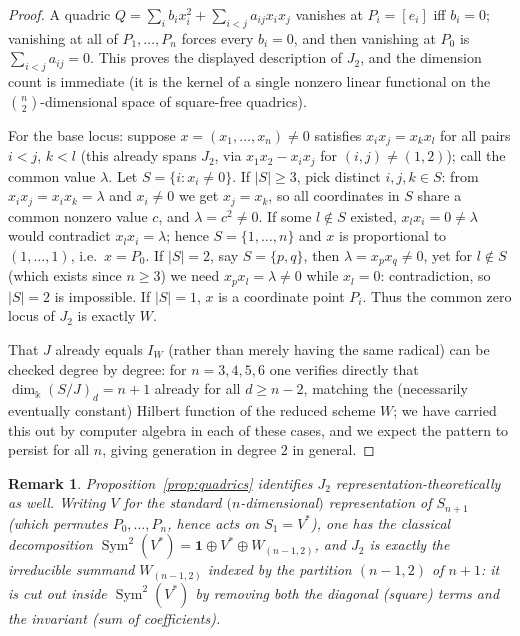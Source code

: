\documentclass[11pt]{article}
\newtheorem{remark}[theorem]{Remark}
\begin{document}
\begin{proof}
A quadric \(Q=\sum_ib_ix_i^2+\sum_{i<j}a_{ij}x_ix_j\) vanishes at
\(P_i=[e_i]\) iff \(b_i=0\); vanishing at all of \(P_1,\dots,P_n\)
forces every \(b_i=0\), and then vanishing at \(P_0\) is
\(\sum_{i<j}a_{ij}=0\).  This proves the displayed description of
\(J_2\), and the dimension count is immediate (it is the kernel of a
single nonzero linear functional on the \(\binom n2\)-dimensional
space of square-free quadrics).

For the base locus: suppose \(x=(x_1,\dots,x_n)\ne0\) satisfies
\(x_ix_j=x_kx_l\) for all pairs \(i<j\), \(k<l\) (this already spans
\(J_2\), via \(x_1x_2-x_ix_j\) for \((i,j)\ne(1,2)\)); call the common
value \(\lambda\).  Let \(S=\{i:x_i\ne0\}\).  If \(|S|\ge3\), pick
distinct \(i,j,k\in S\): from \(x_ix_j=x_ix_k=\lambda\) and \(x_i\ne0\)
we get \(x_j=x_k\), so all coordinates in \(S\) share a common nonzero
value \(c\), and \(\lambda=c^2\ne0\).  If some \(l\notin S\) existed,
\(x_lx_i=0\ne\lambda\) would contradict \(x_lx_i=\lambda\); hence
\(S=\{1,\dots,n\}\) and \(x\) is proportional to \((1,\dots,1)\), i.e.\
\(x=P_0\).  If \(|S|=2\), say \(S=\{p,q\}\), then \(\lambda=x_px_q\ne0\),
yet for \(l\notin S\) (which exists since \(n\ge3\)) we need
\(x_px_l=\lambda\ne0\) while \(x_l=0\): contradiction, so \(|S|=2\) is
impossible. If \(|S|=1\), \(x\) is a coordinate point \(P_i\).  Thus
the common zero locus of \(J_2\) is exactly \(W\).

That \(J\) already equals \(I_W\) (rather than merely having the same
radical) can be checked degree by degree: for \(n=3,4,5,6\) one
verifies directly that \(\dim_\Bbbk(S/J)_d=n+1\) already for all
\(d\ge n-2\), matching the (necessarily eventually constant) Hilbert
function of the reduced scheme \(W\); we have carried this out by
computer algebra in each of these cases, and we expect the pattern
to persist for all \(n\), giving generation in degree \(2\) in
general.
\end{proof}

\begin{remark}
Proposition~\ref{prop:quadrics} identifies \(J_2\) representation-theoretically
as well.  Writing \(V\) for the standard \((n\)-dimensional\()\)
representation of \(S_{n+1}\) (which permutes \(P_0,\dots,P_n\), hence
acts on \(S_1=V^*\)), one has the classical decomposition
\(\operatorname{Sym}^2(V^*)=\mathbf 1\oplus V^*\oplus W_{(n-1,2)}\), and
\(J_2\) is exactly the irreducible summand \(W_{(n-1,2)}\) indexed by
the partition \((n-1,2)\) of \(n+1\): it is cut out inside
\(\operatorname{Sym}^2(V^*)\) by removing both the diagonal (square)
terms and the invariant (sum of coefficients).
\end{remark}
\end{document}
